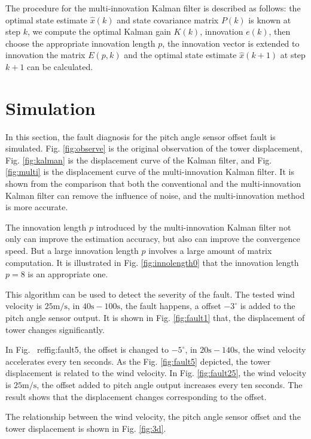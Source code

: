 \documentclass{article}
\begin{document}
The procedure for the multi-innovation Kalman filter is described as follows:
the optimal state estimate $\hat{x}(k)$ and state covariance matrix $P(k)$  is known
at step $k$, we compute the optimal Kalman gain $K(k)$, innovation $e(k)$,
then choose the appropriate innovation length $p$, the innovation vector is extended
to innovation the matrix $E(p, k)$ and the optimal state estimate $\hat{x}(k+1)$
at step $k+1$ can be calculated.

\section{Simulation}

In this section, the fault diagnosis for the pitch angle sensor offset fault is
simulated. Fig. \ref{fig:observe} is the original observation of the tower displacement,
Fig. \ref{fig:kalman} is the displacement curve of the Kalman filter, and
Fig. \ref{fig:multi}
is the displacement curve of the multi-innovation Kalman filter. It is shown
from the comparison that both the conventional and the multi-innovation Kalman filter
can remove the influence of noise, and the multi-innovation method is more accurate.

The innovation length $p$ introduced by the multi-innovation Kalman filter not
only can improve the estimation accuracy, but also can improve the
convergence speed. But a large innovation length $p$ involves a large amount of
matrix computation. It is illustrated in
Fig. \ref{fig:innolength0} that the innovation length $p=8$ is
an appropriate one.

This algorithm can be used to detect the severity of the fault. The tested
wind velocity is $25\mathrm{m/s}$, in $40\mathrm{s}-100\mathrm{s}$, the fault happens, a offset $-3^\circ$
is added to the pitch angle sensor output. It is shown in
Fig. \ref{fig:fault1} that,  the displacement of tower changes significantly.

In
Fig. \ ref{fig:fault5},
the offset is changed to $-5^\circ$, in $20\mathrm{s}-140\mathrm{s}$,  the wind velocity accelerates
every ten seconds. As the Fig. \ref{fig:fault5} depicted, the tower displacement is related
to the wind velocity.
In Fig. \ref{fig:fault25}, the wind velocity is $25\mathrm{m/s}$, the offset added to
pitch angle output increases every ten seconds. The result shows that the displacement
changes corresponding to the offset.

The relationship between the wind velocity, the pitch angle sensor offset and the tower
displacement is shown in Fig. \ref{fig:3d}.
\end{document}
